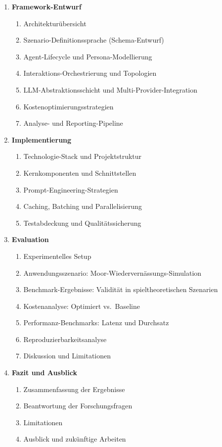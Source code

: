 \documentclass[12pt, a4paper]{article}
\begin{document}
\begin{enumerate}
    \item \textbf{Framework-Entwurf}
    \begin{enumerate}[label=\arabic{enumi}.\arabic*]
        \item Architekturübersicht
        \item Szenario-Definitionssprache (Schema-Entwurf)
        \item Agent-Lifecycle und Persona-Modellierung
        \item Interaktions-Orchestrierung und Topologien
        \item LLM-Abstraktionsschicht und Multi-Provider-Integration
        \item Kostenoptimierungsstrategien
        \item Analyse- und Reporting-Pipeline
    \end{enumerate}

    \item \textbf{Implementierung}
    \begin{enumerate}[label=\arabic{enumi}.\arabic*]
        \item Technologie-Stack und Projektstruktur
        \item Kernkomponenten und Schnittstellen
        \item Prompt-Engineering-Strategien
        \item Caching, Batching und Parallelisierung
        \item Testabdeckung und Qualitätssicherung
    \end{enumerate}

    \item \textbf{Evaluation}
    \begin{enumerate}[label=\arabic{enumi}.\arabic*]
        \item Experimentelles Setup
        \item Anwendungsszenario: Moor-Wiedervernässungs-Simulation
        \item Benchmark-Ergebnisse: Validität in spieltheoretischen Szenarien
        \item Kostenanalyse: Optimiert vs.\ Baseline
        \item Performanz-Benchmarks: Latenz und Durchsatz
        \item Reproduzierbarkeitsanalyse
        \item Diskussion und Limitationen
    \end{enumerate}

    \item \textbf{Fazit und Ausblick}
    \begin{enumerate}[label=\arabic{enumi}.\arabic*]
        \item Zusammenfassung der Ergebnisse
        \item Beantwortung der Forschungsfragen
        \item Limitationen
        \item Ausblick und zukünftige Arbeiten
    \end{enumerate}
\end{enumerate}
\end{document}
